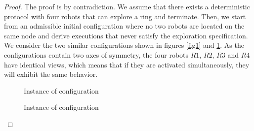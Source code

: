 \documentclass[12pt]{llncs}
\begin{document}
\begin{proof}
The proof is by contradiction. We assume that there exists a deterministic protocol with four robots that can explore a ring and terminate. Then, we start from an admissible initial configuration where no two robots are located on the same node and derive executions that never satisfy the exploration specification.\\

We consider the two similar configurations shown in figures \ref{fig1} and \ref{fig2}. As the configurations contain two axes of symmetry, the four robots $R1$, $R2$, $R3$ and $R4$ have identical views, which means that if they are activated simultaneously, they will exhibit the same behavior. 

\begin{figure}
 \begin{minipage}[b]{.46\linewidth}
  \centering{}
  \caption{Instance of configuration \label{fig1}}
 \end{minipage} \hfill
 \begin{minipage}[b]{.46\linewidth}
  \centering{}
  \caption{Instance of configuration  \label{fig2}}
 \end{minipage}
\end{figure}


\end{proof}
\end{document}
